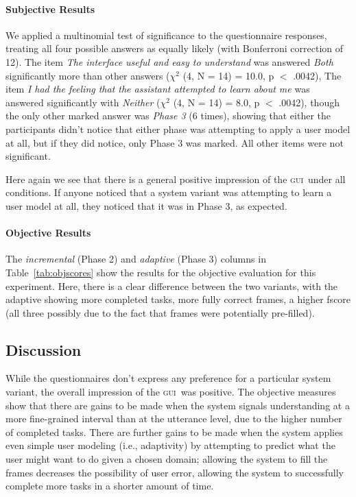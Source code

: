 \documentclass[11pt]{article}
\newcommand{\ui}[0]{\textsc{gui}}
\begin{document}
\paragraph{Subjective Results}  We applied a multinomial test of significance to the questionnaire responses, treating all four possible answers as equally likely (with Bonferroni correction of 12). The item \emph{The interface useful and easy to understand} was answered \emph{Both} significantly more than other answers  ($ \chi^2 $ (4, N = 14) = 10.0, p $<$ .0042), The item \emph{I had the feeling that the assistant attempted to learn about me} was answered significantly with \emph{Neither} ($ \chi^2 $ (4, N = 14) = 8.0, p $<$ .0042), though the only other marked answer was \emph{Phase 3} (6 times), showing that either the participants didn't notice that either phase was attempting to apply a user model at all, but if they did notice, only Phase 3 was marked. All other items were not significant.

Here again we see that there is a general positive impression of the \ui\ under all conditions. If anyone noticed that a system variant was attempting to learn a user model at all, they noticed that it was in Phase 3, as expected. 

\paragraph{Objective Results} The \emph{incremental} (Phase 2) and \emph{adaptive} (Phase 3) columns in Table~\ref{tab:objscores} show the results for the objective evaluation for this experiment. Here, there is a clear difference between the two variants, with the adaptive showing more completed tasks, more fully correct frames, a higher fscore (all three possibly due to the fact that frames were potentially pre-filled). 

\subsection{Discussion}

While the questionnaires don't express any preference for a particular system variant, the overall impression of the \ui\ was positive. The objective measures show that there are gains to be made when the system signals understanding at a more fine-grained interval than at the utterance level, due to the higher number of completed tasks. There are further gains to be made when the system applies even simple user modeling (i.e., adaptivity) by attempting to predict what the user might want to do given a chosen domain; allowing the system to fill the frames decreases the possibility of user error, allowing the system to successfully complete more tasks in a shorter amount of time. 
\end{document}
